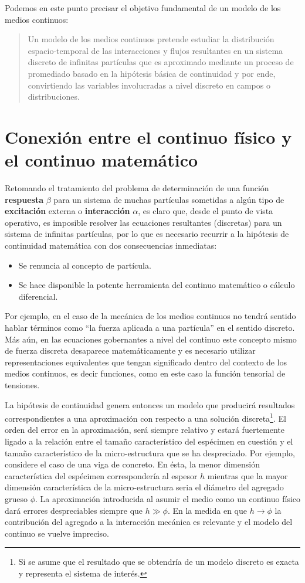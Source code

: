\documentclass[../notas medios.tex]{subfiles}
\begin{document}
Podemos en este punto precisar el objetivo fundamental de un modelo de los medios continuos:
\begin{quote}
Un modelo de los medios continuos pretende estudiar la distribución espacio-temporal de las interacciones  y flujos   resultantes en un sistema discreto de infinitas partículas que es aproximado mediante un proceso de promediado basado en la hipótesis básica de continuidad y por ende, convirtiendo las variables involucradas a nivel discreto en campos o distribuciones.
\end{quote}

\section{Conexión entre el continuo físico y el continuo matemático}
Retomando el tratamiento del problema de determinación de una función {\bf
respuesta} $\beta$ para un sistema de muchas partículas sometidas a algún tipo de {\bf excitación} externa o {\bf interacción} $\alpha$, es
claro que, desde el punto de vista operativo, es imposible resolver las ecuaciones
resultantes (discretas) para un sistema de infinitas partículas, por lo que es necesario recurrir a la hipótesis de continuidad matemática con dos consecuencias inmediatas:
\begin{itemize}
\item Se renuncia al concepto de partícula.
\item Se hace disponible la potente herramienta del continuo matemático o
cálculo diferencial.
\end{itemize}

Por ejemplo, en el caso de la mecánica de los medios continuos no tendrá sentido
hablar términos como ``la fuerza aplicada a una partícula” en el sentido 
discreto. Más aún, en las ecuaciones gobernantes a nivel del continuo este 
concepto mismo de fuerza discreta desaparece matemáticamente y es necesario 
utilizar representaciones equivalentes que tengan significado dentro del 
contexto de los medios continuos, es decir funciones, como en este caso la 
función tensorial de tensiones.

La hipótesis de continuidad genera entonces un modelo que producirá resultados 
correspondientes a una aproximación con respecto a una solución 
discreta\footnote{Si se asume que el resultado que se obtendría de un modelo 
discreto es exacta y representa el sistema de interés.}. El orden del error en 
la aproximación, será siempre relativo y estará fuertemente ligado a la 
relación entre el tamaño característico del espécimen en cuestión y el tamaño 
característico de la micro-estructura que se ha despreciado.  Por ejemplo, 
considere el caso de una viga de concreto.  En ésta, la menor dimensión 
característica del espécimen correspondería al espesor $h$ mientras que la 
mayor dimensión característica de la micro-estructura seria el diámetro del 
agregado grueso $\phi$.  La aproximación introducida al asumir el medio como un 
continuo físico dará errores despreciables siempre que $h \gg \phi$.  En la 
medida en que $h \to \phi$   la contribución del agregado a la interacción 
mecánica es relevante y el modelo del continuo se vuelve impreciso.
\end{document}
